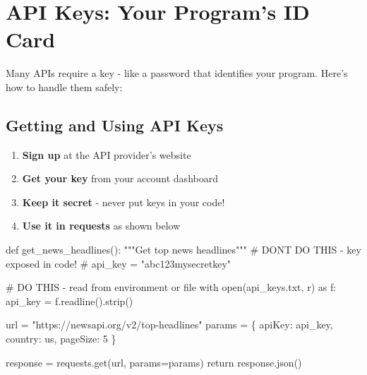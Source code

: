 \documentclass[
  letterpaper,
  DIV=11,
  numbers=noendperiod,
  oneside]{scrreprt}
\newenvironment{Shaded}{}{}
\newcommand{\BuiltInTok}[1]{\textcolor[rgb]{0.84,0.23,0.29}{#1}}
\newcommand{\CommentTok}[1]{\textcolor[rgb]{0.42,0.45,0.49}{#1}}
\newcommand{\ControlFlowTok}[1]{\textcolor[rgb]{0.84,0.23,0.29}{#1}}
\newcommand{\DecValTok}[1]{\textcolor[rgb]{0.00,0.36,0.77}{#1}}
\newcommand{\ImportTok}[1]{\textcolor[rgb]{0.01,0.18,0.38}{#1}}
\newcommand{\KeywordTok}[1]{\textcolor[rgb]{0.84,0.23,0.29}{#1}}
\newcommand{\NormalTok}[1]{\textcolor[rgb]{0.14,0.16,0.18}{#1}}
\newcommand{\OperatorTok}[1]{\textcolor[rgb]{0.14,0.16,0.18}{#1}}
\newcommand{\StringTok}[1]{\textcolor[rgb]{0.01,0.18,0.38}{#1}}
\providecommand{\tightlist}{%
  \setlength{\itemsep}{0pt}\setlength{\parskip}{0pt}}\usepackage{longtable,booktabs,array}
\begin{document}
\section{API Keys: Your Program's ID
Card}\label{api-keys-your-programs-id-card}

Many APIs require a key - like a password that identifies your program.
Here's how to handle them safely:

\subsection{Getting and Using API
Keys}\label{getting-and-using-api-keys}

\begin{enumerate}
\def\labelenumi{\arabic{enumi}.}
\tightlist
\item
  \textbf{Sign up} at the API provider's website
\item
  \textbf{Get your key} from your account dashboard
\item
  \textbf{Keep it secret} - never put keys in your code!
\item
  \textbf{Use it in requests} as shown below
\end{enumerate}

\begin{Shaded}
\begin{Highlighting}[]
\KeywordTok{def}\NormalTok{ get\_news\_headlines():}
    \CommentTok{"""Get top news headlines"""}
    \CommentTok{\# DON\textquotesingle{}T DO THIS {-} key exposed in code!}
    \CommentTok{\# api\_key = "abc123mysecretkey"}
    
    \CommentTok{\# DO THIS {-} read from environment or file}
    \ControlFlowTok{with} \BuiltInTok{open}\NormalTok{(}\StringTok{\textquotesingle{}api\_keys.txt\textquotesingle{}}\NormalTok{, }\StringTok{\textquotesingle{}r\textquotesingle{}}\NormalTok{) }\ImportTok{as}\NormalTok{ f:}
\NormalTok{        api\_key }\OperatorTok{=}\NormalTok{ f.readline().strip()}
    
\NormalTok{    url }\OperatorTok{=} \StringTok{"https://newsapi.org/v2/top{-}headlines"}
\NormalTok{    params }\OperatorTok{=}\NormalTok{ \{}
        \StringTok{\textquotesingle{}apiKey\textquotesingle{}}\NormalTok{: api\_key,}
        \StringTok{\textquotesingle{}country\textquotesingle{}}\NormalTok{: }\StringTok{\textquotesingle{}us\textquotesingle{}}\NormalTok{,}
        \StringTok{\textquotesingle{}pageSize\textquotesingle{}}\NormalTok{: }\DecValTok{5}
\NormalTok{    \}}
    
\NormalTok{    response }\OperatorTok{=}\NormalTok{ requests.get(url, params}\OperatorTok{=}\NormalTok{params)}
    \ControlFlowTok{return}\NormalTok{ response.json()}
\end{Highlighting}
\end{Shaded}
\end{document}
